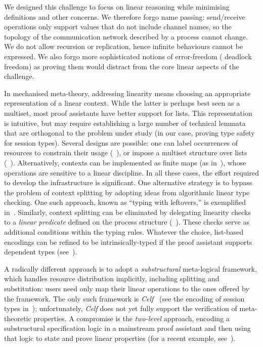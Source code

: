 \documentclass[runningheads]{llncs}
\begin{document}
We designed this challenge to focus on linear reasoning while minimising
definitions and other concerns.  We therefore forgo name passing:
send/receive operations only support values that do not include channel names, so
the topology of the communication network described by a process cannot change.
We do not allow recursion or replication, hence infinite behaviours cannot be
expressed. We also forgo more sophisticated notions of error-freedom (\eg
deadlock freedom) as proving them would distract from the core linear
aspects of the challenge.

In mechanised meta-theory, addressing linearity means choosing an appropriate
representation of a linear context.  While the latter  is perhaps
best seen as a multiset, most proof assistants have better support for lists.
This representation is intuitive, but may require
establishing a large number of technical lemmata that are orthogonal to the
problem under study (in our case, proving type safety for session types).
Several designs are possible: one can label
occurrences of resources to constrain their usage (\eg~\cite{CicconeP20}), or impose a multiset structure over lists
(\eg~\cite{Danielsson12,ChaudhuriLR19}). Alternatively, contexts can be
implemented as finite maps (as in~\cite{Castro2020}), whose operations are
sensitive to a linear discipline. In all these cases, the effort required to
develop the infrastructure is significant.
One alternative strategy is to bypass the problem of context splitting
by adopting ideas from algorithmic linear type checking. One such
approach, known as ``typing with leftovers,'' is exemplified
in~\cite{DBLP:conf/forte/ZalakainD21}.
Similarly, context splitting can be eliminated by delegating linearity checks to a
\emph{linear predicate} defined on the process structure (\eg~\cite{BP23}).
These checks serve as additional conditions within the typing rules.
Whatever the choice, list-based encodings can be refined to be intrinsically-typed if the
proof assistant supports dependent types
(see~\cite{Thiemann2019,CicconeP20,RouvoetPKV20}).

A radically different approach is to adopt a \emph{substructural}
meta-logical framework, which handles resource
distribution implicitly, including splitting and
substitution: users need only map their linear operations to the
ones offered by the framework.  The only such framework is
\emph{Celf}~\cite{Schack-Nielsen:IJCAR08} (see the encoding of session
types in~\cite{Bock2016}); unfortunately, \emph{Celf} does not yet
fully support the verification of meta-theoretic properties.  A
compromise is the \emph{two-level} approach, \ie encoding a
substructural specification logic in a mainstream proof assistant and
then using that logic to state and prove linear properties (for a
recent example, see~\cite{Felty:MSCS21}). 
\end{document}
